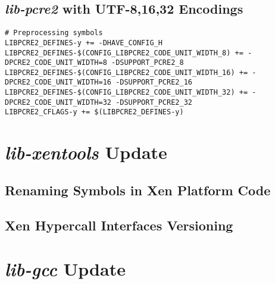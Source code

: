 \subsection{\textit{lib-pcre2} with UTF-8,16,32 Encodings}
\label{subsec:pcre2-menuconfig}


\begin{lstlisting}
# Preprocessing symbols
LIBPCRE2_DEFINES-y += -DHAVE_CONFIG_H
LIBPCRE2_DEFINES-$(CONFIG_LIBPCRE2_CODE_UNIT_WIDTH_8) += -DPCRE2_CODE_UNIT_WIDTH=8 -DSUPPORT_PCRE2_8
LIBPCRE2_DEFINES-$(CONFIG_LIBPCRE2_CODE_UNIT_WIDTH_16) += -DPCRE2_CODE_UNIT_WIDTH=16 -DSUPPORT_PCRE2_16
LIBPCRE2_DEFINES-$(CONFIG_LIBPCRE2_CODE_UNIT_WIDTH_32) += -DPCRE2_CODE_UNIT_WIDTH=32 -DSUPPORT_PCRE2_32
LIBPCRE2_CFLAGS-y += $(LIBPCRE2_DEFINES-y)
\end{lstlisting}

\section{\textit{lib-xentools} Update}
\label{sec:lib-xentools-update}

\subsection{Renaming Symbols in Xen Platform Code}
\label{subsec:xen-renaming-symbols}

\subsection{Xen Hypercall Interfaces Versioning}
\label{subsec:xen-interface-versioning}

\section{\textit{lib-gcc} Update}
\label{sec:lib-gcc-update}
